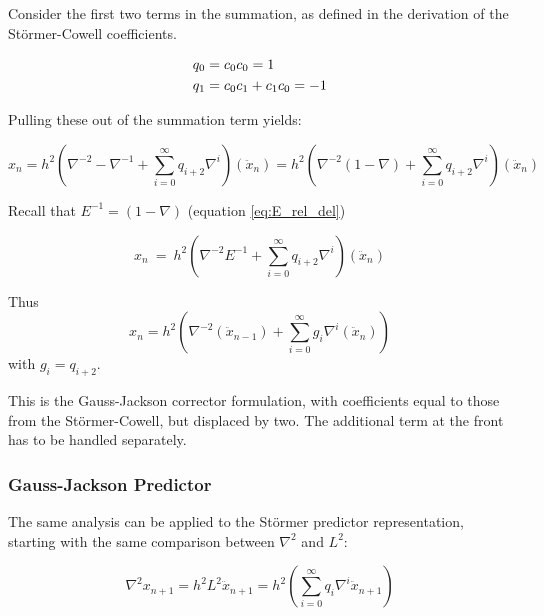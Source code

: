 Consider the first two terms in the summation, as defined in the derivation of the St\"ormer-Cowell coefficients. 

\begin{equation*}
\begin{gathered}q_{0}=c_{0}c_{0}=1\hfill
\\q_{1}=c_{0}c_{1}+c_{1}c_{0}=-1\end{gathered}
\end{equation*}

Pulling these out of the summation term yields:

\begin{equation*}
x_{n} =
h^{2}\left(\nabla ^{-2}-\nabla ^{-1}+\sum _{i=0}^{\infty}q_{i+2}\nabla ^{i}\right)
({\ddot{x}}_{n}) =
h^{2}\left(\nabla ^{-2}(1-\nabla )+\sum_{i=0}^{\infty }q_{i+2}\nabla ^{i}\right)
({\ddot{x}}_{n})
\end{equation*}

Recall that $E^{-1} = (1-\nabla)$ (equation \ref{eq:E_rel_del})

\begin{equation*}
x_{n}\ =\ h^{2}\left(\nabla ^{-2}E^{-1}+\sum _{i=0}^{\infty
}q_{i+2}\nabla ^{i}\right)({\ddot{x}}_{n})
\end{equation*}

Thus
\begin{equation}
x_{n} = h^{2}\left(
\nabla ^{-2}({\ddot{x}}_{n-1})+
\sum _{i=0}^{\infty}g_{i}\nabla ^{i}({\ddot{x}}_{n})
\right)
\end{equation}
with  $g_{i}=q_{i+2}$.

This is the Gauss-Jackson corrector formulation, with coefficients equal to
those from the St\"ormer-Cowell, but displaced by two. The additional term at
the front has to be handled separately.



\subsubsection{Gauss-Jackson Predictor}

The same analysis can be applied to the St\"ormer predictor
representation, starting with the same comparison between $\nabla ^2$ and 
$L^2$:

\begin{equation*}
\nabla ^{2}x_{n+1}=h^{2}L^2\ddot{x}_{n+1} = 
h^2\left(\sum _{i=0}^{\infty
}q_{i}\nabla ^{i}{\ddot{x}}_{n+1}\right)
\end{equation*}


